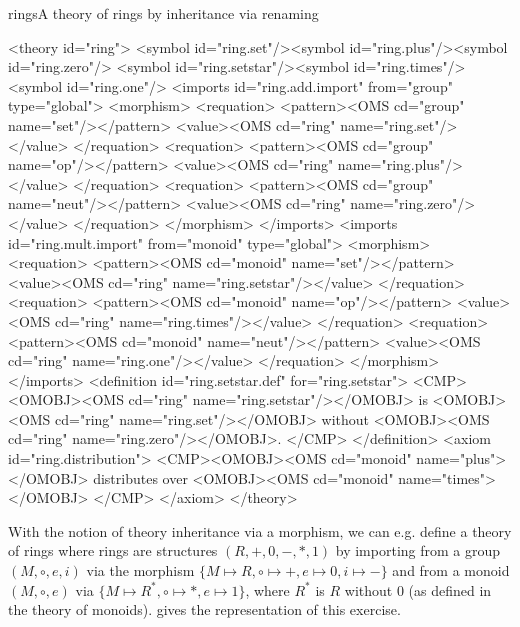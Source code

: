 \begin{myfig}{rings}{A theory of rings by inheritance via renaming}\scriptsize
\begin{boxedverbatim}
<theory id="ring"> 
  <symbol id="ring.set"/><symbol id="ring.plus"/><symbol id="ring.zero"/> 
  <symbol id="ring.setstar"/><symbol id="ring.times"/><symbol id="ring.one"/> 
  <imports id="ring.add.import" from="group" type="global">
    <morphism> 
      <requation> 
        <pattern><OMS cd="group" name="set"/></pattern>
        <value><OMS cd="ring" name="ring.set"/></value> 
      </requation> 
      <requation>
        <pattern><OMS cd="group" name="op"/></pattern> 
        <value><OMS cd="ring" name="ring.plus"/></value> 
      </requation> 
      <requation> 
        <pattern><OMS cd="group" name="neut"/></pattern> 
        <value><OMS cd="ring" name="ring.zero"/></value>
      </requation> 
    </morphism> 
  </imports> 
  <imports id="ring.mult.import" from="monoid" type="global"> 
    <morphism> 
      <requation> 
        <pattern><OMS cd="monoid" name="set"/></pattern> 
        <value><OMS cd="ring" name="ring.setstar"/></value>
      </requation> 
      <requation> 
        <pattern><OMS cd="monoid" name="op"/></pattern>
        <value><OMS cd="ring" name="ring.times"/></value> 
      </requation> 
      <requation>
        <pattern><OMS cd="monoid" name="neut"/></pattern> 
        <value><OMS cd="ring" name="ring.one"/></value> 
      </requation> 
    </morphism> 
  </imports> 
  <definition id="ring.setstar.def" for="ring.setstar"> 
    <CMP> <OMOBJ><OMS cd="ring" name="ring.setstar"/></OMOBJ> is 
      <OMOBJ><OMS cd="ring" name="ring.set"/></OMOBJ> without 
      <OMOBJ><OMS cd="ring" name="ring.zero"/></OMOBJ>.  
    </CMP> 
  </definition> 
  <axiom id="ring.distribution"> 
    <CMP><OMOBJ><OMS cd="monoid" name="plus"></OMOBJ> distributes over 
      <OMOBJ><OMS cd="monoid" name="times"></OMOBJ> 
    </CMP> 
  </axiom>
</theory>
\end{boxedverbatim}
\normalsize
\end{myfig}

With the notion of theory inheritance via a morphism, we can e.g. define a theory
of rings where rings are structures $(R,+,0,-,*,1)$ by importing from a group
$(M,\circ,e,i)$ via the morphism $\{M\mapsto R,\circ\mapsto+,e\mapsto 0,i\mapsto
-\}$ and from a monoid $(M,\circ,e)$ via $\{M\mapsto R^*,\circ\mapsto*,e\mapsto
1\}$, where $R^*$ is $R$ without 0 (as defined in the theory of monoids).
{} gives the {\omdoc} representation of this exercise.

